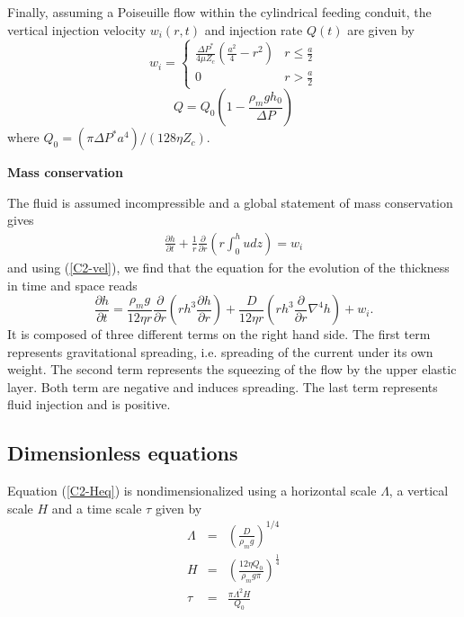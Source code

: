 Finally,  assuming a  Poiseuille flow  within the  cylindrical feeding
conduit, the vertical injection velocity $w_i(r,t)$ and injection rate
$Q(t)$ are given by
\begin{equation}
  w_i=
  \begin{cases}
    \frac{ \Delta P^*}{4 \mu Z_{c}} (\frac{a^{2}}{4}-r^{2})& r \le \frac{a}{2}\\
    0 & r > \frac{a}{2}
  \end{cases}
  \label{C2-eq12}
\end{equation}
\begin{equation}
  Q = Q_0(1-\frac{\rho_m g h_0}{\Delta P})
  \label{C2-eq11}
\end{equation}
where
$Q_0=\left(\pi \Delta P^* a^{4}\right)/\left(128 \eta Z_c\right)$.

\vspace{.5cm} \textbf{Mass conservation} \vspace{.5cm}

The fluid  is assumed  incompressible and a  global statement  of mass
conservation gives
\begin{eqnarray}
  \frac{\partial         h}{\partial        t} +\frac{1}{r}
  \frac{\partial}{\partial
  r} \left( r\int_0^hudz\right) = w_i
  \label{C2-Mass}
\end{eqnarray}
and using (\ref{C2-vel}), we find  that the equation for the evolution
of the thickness in time and space reads
\begin{equation}
  \frac{\partial h}{\partial t} =\frac{\rho_mg}{12 \eta r}
  \frac{\partial}{\partial r}  \left( rh^3  \frac{\partial h}{\partial
      r}\right)+\frac{D}{12\eta r} \left( rh^3 \frac{\partial}{\partial r}\nabla^4h\right)+
  w_i .\label{C2-Heq}
\end{equation}
It is  composed of three different  terms on the right  hand side. The
first term represents gravitational  spreading, i.e.  spreading of the
current under its own weight. The second term represents the squeezing
of the  flow by the upper  elastic layer.  Both term  are negative and
induces spreading.   The last term  represents fluid injection  and is
positive.

\subsection{Dimensionless equations}
\label{C2-sec:dimens-equat}

Equation (\ref{C2-Heq}) is nondimensionalized using a horizontal scale
$\Lambda$, a vertical scale $H$ and a time scale $\tau$ given by
\begin{eqnarray}
  \Lambda &=& \left(\frac{D}{\rho_m g}\right)^{1/4}\label{L1}\\
  H&=&\left       (\frac{12\eta      Q_{0}}{\rho_{m}g       \pi}\right      )
       ^{\frac{1}{4}} \label{H1}\\
  \tau&=&\frac{\pi \Lambda^{2} H}{Q_{0}}\label{T1}
\end{eqnarray}

